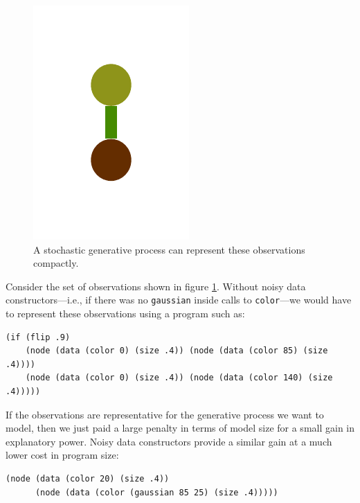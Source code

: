 \documentclass[a4paper,10pt]{article}
\begin{document}
\begin{figure}[t]
\includegraphics[scale=.26]{./figures/4-2-4-noisy-constructor-example-b-0.pdf}
\caption{A stochastic generative process can represent these observations compactly.}
\label{fig:noiseCons}
\end{figure}

Consider the set of observations shown in figure \ref{fig:noiseCons}. Without noisy data constructors---i.e., if there was no \texttt{gaussian} inside calls to \texttt{color}---we would have to represent these observations using a program such as:
\begin{lstlisting}
(if (flip .9)
    (node (data (color 0) (size .4)) (node (data (color 85) (size .4))))
    (node (data (color 0) (size .4)) (node (data (color 140) (size .4)))))
\end{lstlisting}
If the observations are representative for the generative process we want to model, then we just paid a large penalty in terms of model size for a small gain in explanatory power. Noisy data constructors provide a similar gain at a much lower cost in program size:
\begin{lstlisting}
(node (data (color 20) (size .4))
      (node (data (color (gaussian 85 25) (size .4)))))
\end{lstlisting}
\end{document}
